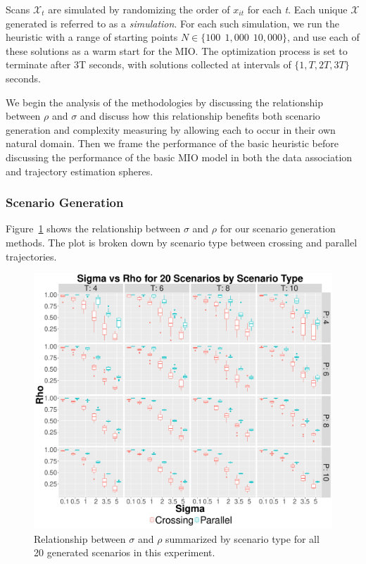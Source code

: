 Scans $\mathcal{X}_{t}$ are simulated by randomizing the order of $x_{it}$ for each \textit{t}. Each unique $\boldsymbol{\mathcal{X}}$ generated is referred to as a \textit{simulation}. For each such simulation, we run the heuristic with a range of starting points $N \in \{100\ \ 1,000\ \ 10,000\}$, and use each of these solutions as a warm start for the MIO. The optimization process is set to terminate after 3T seconds, with solutions collected at intervals of $\{1,T,2T,3T\}$ seconds.

We begin the analysis of the methodologies by discussing the relationship between $\rho$ and $\sigma$ and discuss how this relationship benefits both scenario generation and complexity measuring by allowing each to occur in their own natural domain. Then we frame the performance of the basic heuristic before discussing the performance of the basic MIO model in both the data association and trajectory estimation spheres.

\subsubsection{Scenario Generation}
Figure~\ref{fig:Sigma_vs_Rho} shows the relationship between $\sigma$ and $\rho$ for our scenario generation methods. The plot is broken down by scenario type between crossing and parallel trajectories. 

\begin{figure}[ht]
  \centering
  \includegraphics[width=\columnwidth]{../Figures//Sigma_vs_Rho}
    \caption{Relationship between $\sigma$ and $\rho$ summarized by scenario type for all 20 generated scenarios in this experiment.}
    \label{fig:Sigma_vs_Rho}
\end{figure}

